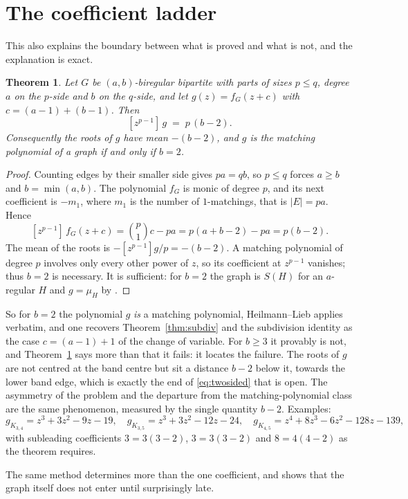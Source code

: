 \documentclass[11pt]{article}
\newtheorem{theorem}{Theorem}
\theoremstyle{remark}
\begin{document}
\section{The coefficient ladder}

This also explains the boundary between what is proved and what is not, and the
explanation is exact.

\begin{theorem}\label{thm:subcoef}
Let $G$ be $(a,b)$-biregular bipartite with parts of sizes $p\le q$, degree $a$
on the $p$-side and $b$ on the $q$-side, and let $g(z)=f_G(z+c)$ with
$c=(a-1)+(b-1)$. Then
\[
[z^{p-1}]\,g \;=\; p\,(b-2).
\]
Consequently the roots of $g$ have mean $-(b-2)$, and $g$ is the matching
polynomial of a graph if and only if $b=2$.
\end{theorem}

\begin{proof}
Counting edges by their smaller side gives $pa=qb$, so $p\le q$ forces $a\ge b$
and $b=\min(a,b)$. The polynomial $f_G$ is monic of degree $p$, and its next
coefficient is $-m_1$, where $m_1$ is the number of $1$-matchings, that is
$|E|=pa$. Hence
\[
[z^{p-1}]\,f_G(z+c)=\binom{p}{1}c-pa=p(a+b-2)-pa=p(b-2).
\]
The mean of the roots is $-[z^{p-1}]g/p=-(b-2)$. A matching polynomial of
degree $p$ involves only every other power of $z$, so its coefficient at
$z^{p-1}$ vanishes; thus $b=2$ is necessary. It is sufficient: for $b=2$ the
graph is $S(H)$ for an $a$-regular $H$ and $g=\mu_H$ by \cite{YY}.
\end{proof}

So for $b=2$ the polynomial $g$ \emph{is} a matching polynomial, Heilmann--Lieb
applies verbatim, and one recovers Theorem~\ref{thm:subdiv} and the subdivision
identity as the case $c=(a-1)+1$ of the change of variable. For $b\ge3$ it
provably is not, and Theorem~\ref{thm:subcoef} says more than that it fails: it
locates the failure. The roots of $g$ are not centred at the band centre but sit
a distance $b-2$ below it, towards the lower band edge, which is exactly the
end of \eqref{eq:twosided} that is open. The asymmetry of the problem and the
departure from the matching-polynomial class are the same phenomenon, measured
by the single quantity $b-2$. Examples:
\[
g_{K_{3,4}}=z^3+3z^2-9z-19,\quad
g_{K_{3,5}}=z^3+3z^2-12z-24,\quad
g_{K_{4,5}}=z^4+8z^3-6z^2-128z-139,
\]
with subleading coefficients $3=3(3-2)$, $3=3(3-2)$ and $8=4(4-2)$ as the
theorem requires.

The same method determines more than the one coefficient, and shows that the
graph itself does not enter until surprisingly late.
\end{document}
